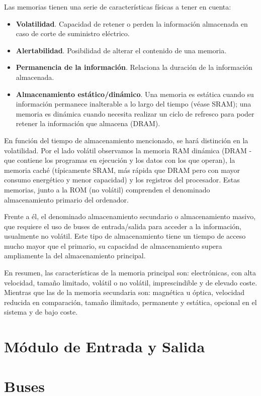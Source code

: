 \documentclass[a4paper, 11pt, titlepage]{article}
\begin{document}
        Las memorias tienen una serie de características físicas a tener en cuenta:

        \begin{itemize}
            \item \textbf{Volatilidad}. Capacidad de retener o perden la información almacenada en caso de 
            corte de suministro eléctrico.
            \item \textbf{Alertabilidad}. Posibilidad de alterar el contenido de una memoria.
            \item \textbf{Permanencia de la información}. Relaciona la duración de la información almacenada.
            \item \textbf{Almacenamiento estático/dinámico}. Una memoria es estática cuando su información 
            permanece inalterable a lo largo del tiempo (véase SRAM); una memoria es dinámica cuando necesita 
            realizar un ciclo de refresco para poder retener la información que almacena (DRAM).  
        \end{itemize}

        En función del tiempo de almacenamiento mencionado, se hará distinción en la volatilidad. Por el lado volátil 
        observamos la memoria RAM dinámica (DRAM - que contiene los programas en ejecución y los datos con los que operan), 
        la memoria caché (típicamente SRAM, más rápida que DRAM pero con mayor consumo energético y menor capacidad) y los 
        registros del procesador. Estas memorias, junto a la ROM (no volátil) comprenden el denominado almacenamiento 
        primario del ordenador.

        Frente a él, el denominado almacenamiento secundario o almacenamiento masivo, que requiere el uso de buses 
        de entrada/salida para acceder a la información, usualmente no volátil. Este tipo de almacenamiento tiene un 
        tiempo de acceso mucho mayor que el primario, su capacidad de almacenamiento supera ampliamente la del almacenamiento 
        principal.

        En resumen, las características de la memoria principal son: electrónicas, con alta velocidad, tamaño limitado, 
        volátil o no volátil, imprescindible y de elevado coste. Mientras que las de la memoria secundaria son: 
        magnética u óptica, velocidad reducida en comparación, tamaño ilimitado, permanente y estática, opcional en el sistema 
        y de bajo coste.

\section{Módulo de Entrada y Salida}\label{entradasalida}
\section{Buses}
\end{document}
